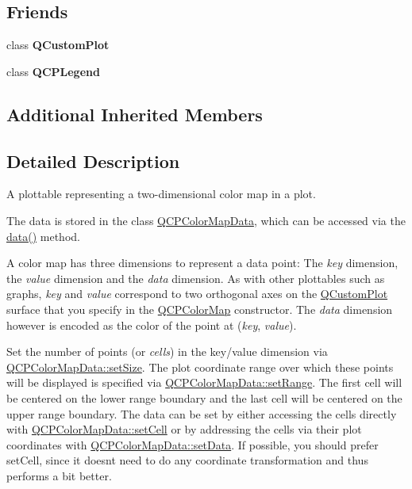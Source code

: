 \subsection*{Friends}
\begin{DoxyCompactItemize}
\item 
\hypertarget{class_q_c_p_color_map_a1cdf9df76adcfae45261690aa0ca2198}{}\label{class_q_c_p_color_map_a1cdf9df76adcfae45261690aa0ca2198} 
class {\bfseries Q\+Custom\+Plot}
\item 
\hypertarget{class_q_c_p_color_map_a8429035e7adfbd7f05805a6530ad5e3b}{}\label{class_q_c_p_color_map_a8429035e7adfbd7f05805a6530ad5e3b} 
class {\bfseries Q\+C\+P\+Legend}
\end{DoxyCompactItemize}
\subsection*{Additional Inherited Members}


\subsection{Detailed Description}
A plottable representing a two-\/dimensional color map in a plot. 



The data is stored in the class \hyperlink{class_q_c_p_color_map_data}{Q\+C\+P\+Color\+Map\+Data}, which can be accessed via the \hyperlink{class_q_c_p_color_map_a047d7eb3ae657f93f2f39b5e68b79451}{data()} method.

A color map has three dimensions to represent a data point\+: The {\itshape key} dimension, the {\itshape value} dimension and the {\itshape data} dimension. As with other plottables such as graphs, {\itshape key} and {\itshape value} correspond to two orthogonal axes on the \hyperlink{class_q_custom_plot}{Q\+Custom\+Plot} surface that you specify in the \hyperlink{class_q_c_p_color_map}{Q\+C\+P\+Color\+Map} constructor. The {\itshape data} dimension however is encoded as the color of the point at ({\itshape key}, {\itshape value}).

Set the number of points (or {\itshape cells}) in the key/value dimension via \hyperlink{class_q_c_p_color_map_data_a0d9ff35c299d0478b682bfbcdd9c097e}{Q\+C\+P\+Color\+Map\+Data\+::set\+Size}. The plot coordinate range over which these points will be displayed is specified via \hyperlink{class_q_c_p_color_map_data_aad9c1c7c703c1339489fc730517c83d4}{Q\+C\+P\+Color\+Map\+Data\+::set\+Range}. The first cell will be centered on the lower range boundary and the last cell will be centered on the upper range boundary. The data can be set by either accessing the cells directly with \hyperlink{class_q_c_p_color_map_data_a8e75eaf8746596319032a93f3d2d0683}{Q\+C\+P\+Color\+Map\+Data\+::set\+Cell} or by addressing the cells via their plot coordinates with \hyperlink{class_q_c_p_color_map_data_afd2083ccfd6987ec94aa7ef8e91ca39a}{Q\+C\+P\+Color\+Map\+Data\+::set\+Data}. If possible, you should prefer set\+Cell, since it doesn\textquotesingle{}t need to do any coordinate transformation and thus performs a bit better.

